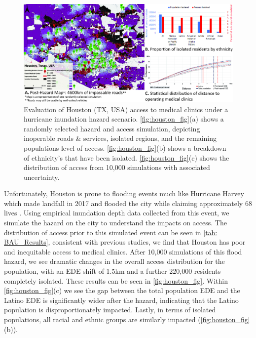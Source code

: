 \documentclass[review,3p,times,onecolumn,sort&compress,12pt]{elsarticle}
\let \cite \parencite
\begin{document}
\begin{figure}[h]
    \includegraphics[width=1\linewidth]{report/fig/tx_fig.jpg}
    \caption{Evaluation of Houston (TX, USA) access to medical clinics under a hurricane inundation hazard scenario. \autoref{fig:houston_fig}(a) shows a randomly selected hazard and access simulation, depicting inoperable roads \& services, isolated regions, and the remaining populations level of access. \autoref{fig:houston_fig}(b) shows a breakdown of ethnicity's that have been isolated. \autoref{fig:houston_fig}(c) shows the distribution of access from 10,000 simulations with associated uncertainty.}
    \label{fig:houston_fig}
\end{figure}

Unfortunately, Houston is prone to flooding events much like Hurricane Harvey which made landfall in 2017 and flooded the city while claiming approximately 68 lives \cite{FEMA_Data}.
Using empirical inundation depth data collected from this event, we simulate the hazard on the city to understand the impacts on access.
The distribution of access prior to this simulated event can be seen in \autoref{tab: BAU_Results}, consistent with previous studies, we find that Houston has poor and inequitable access to medical clinics.
After 10,000 simulations of this flood hazard, we see dramatic changes in the overall access distribution for the population, with an EDE shift of 1.5km and a further 220,000 residents completely isolated.
These results can be seen in \autoref{fig:houston_fig}.
Within \autoref{fig:houston_fig}(c) we see the gap between the total population EDE and the Latino EDE is significantly wider after the hazard, indicating that the Latino population is disproportionately impacted.
Lastly, in terms of isolated populations, all racial and ethnic groups are similarly impacted (\autoref{fig:houston_fig}(b)).
\end{document}
